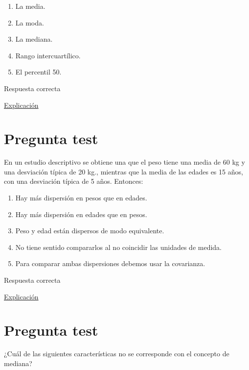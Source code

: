 \documentclass[
]{book}
\providecommand{\tightlist}{%
  \setlength{\itemsep}{0pt}\setlength{\parskip}{0pt}}
\begin{document}
\begin{enumerate}
\def\labelenumi{\alph{enumi})}
\tightlist
\item
  La media.
\item
  La moda.
\item
  La mediana.
\item
  Rango intercuartílico.
\item
  El percentil 50.
\end{enumerate}

Respuesta correcta

\href{https://1fjmanzano.github.io/bioestadistica/medidas-de-posicio\%CC\%81n-dispersio\%CC\%81n-y-forma.html\#medidas-de-posicio\%CC\%81n-centrales}{Explicación}

\hypertarget{pregunta-test-36}{%
\section{Pregunta test}\label{pregunta-test-36}}

En un estudio descriptivo se obtiene una que el peso tiene una media de 60 kg y una desviación típica de 20 kg., mientras que la media de las edades es 15 años, con una desviación típica de 5 años. Entonces:

\begin{enumerate}
\def\labelenumi{\alph{enumi})}
\tightlist
\item
  Hay más dispersión en pesos que en edades.
\item
  Hay más dispersión en edades que en pesos.
\item
  Peso y edad están dispersos de modo equivalente.
\item
  No tiene sentido compararlos al no coincidir las unidades de medida.
\item
  Para comparar ambas dispersiones debemos usar la covarianza.
\end{enumerate}

Respuesta correcta

\href{https://1fjmanzano.github.io/bioestadistica/medidas-de-posicio\%CC\%81n-dispersio\%CC\%81n-y-forma.html}{Explicación}

\hypertarget{pregunta-test-37}{%
\section{Pregunta test}\label{pregunta-test-37}}

¿Cuál de las siguientes características no se corresponde con el concepto de mediana?
\end{document}
